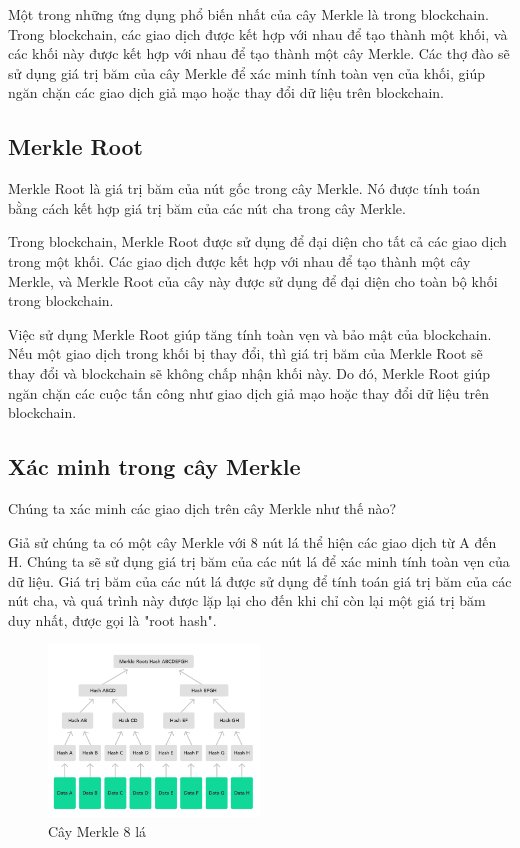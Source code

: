 Một trong những ứng dụng phổ biến nhất của cây Merkle là trong blockchain. Trong blockchain,
các giao dịch được kết hợp với nhau để tạo thành một khối, và các khối này được kết hợp với nhau 
để tạo thành một cây Merkle. Các thợ đào sẽ sử dụng giá trị băm của cây Merkle để xác minh tính 
toàn vẹn của khối, giúp ngăn chặn các giao dịch giả mạo hoặc thay đổi dữ liệu trên blockchain.


\subsection{Merkle Root}

Merkle Root là giá trị băm  của nút gốc trong cây Merkle. Nó được tính toán 
bằng cách kết hợp giá trị băm của các nút cha trong cây Merkle.

Trong blockchain, Merkle Root được sử dụng để đại diện cho tất cả các giao dịch trong một khối. 
Các giao dịch được kết hợp với nhau để tạo thành một cây Merkle, và Merkle Root của cây này 
được sử dụng để đại diện cho toàn bộ khối trong blockchain.

Việc sử dụng Merkle Root giúp tăng tính toàn vẹn và bảo mật của blockchain. Nếu một giao dịch trong khối bị thay đổi, thì giá trị băm của Merkle Root sẽ thay đổi và blockchain sẽ không chấp nhận khối này. Do đó, Merkle Root giúp ngăn chặn các cuộc tấn công như giao dịch giả mạo hoặc thay đổi dữ liệu trên blockchain.

\subsection{Xác minh trong cây Merkle }

Chúng ta xác minh các giao dịch trên cây Merkle như thế nào?

Giả sử chúng ta có một cây Merkle với 8 nút lá thể hiện các giao dịch từ A đến H. Chúng ta sẽ sử dụng giá trị băm 
của các nút lá để xác minh tính toàn vẹn của dữ liệu. Giá trị băm của các nút lá 
được sử dụng để tính toán giá trị băm của các nút cha, và quá trình này được lặp 
lại cho đến khi chỉ còn lại một giá trị băm duy nhất, được gọi là "root hash". 

\begin{figure}[h]
    \centering
    \includegraphics[width=0.5\textwidth]{images/merkle-tree-8levels.png}
    \caption{Cây Merkle 8 lá}
    \label{fig:merkle_tree_8levels}
\end{figure}


